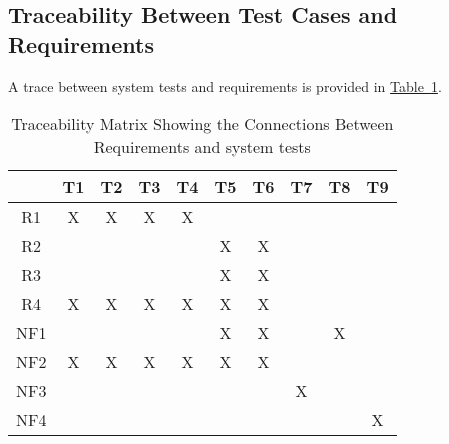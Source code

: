 \documentclass[12pt, titlepage]{article}
\begin{document}
\subsection{Traceability Between Test Cases and Requirements}
A trace between system tests and requirements is provided in 
\hyperref[tab:reqtrace]{Table~\ref*{tab:reqtrace}}.

\begin{table}[h!]
\centering
\begin{tabular}{|c|c|c|c|c|c|c|c|c|c|}
\hline
	& T1 & T2 & T3 & T4 & T5 & T6 & T7 &T8  & T9 \\
\hline
R1  & X&X&X& X& & & & & \\ \hline
R2  & & & & & X& X& &  & \\ \hline
R3  & & & & &X & X& &   &\\ \hline
R4  &X & X& X& X&X & X& & & \\ \hline
NF1 & & & & & X& X& & X &  \\ \hline
NF2   & X& X& X&X & X& X& & & \\ \hline
NF3   & & & & & & &X & & \\ \hline
NF4   & & & & & & & & &X \\ \hline
\hline
\end{tabular}
\caption{Traceability Matrix Showing the Connections Between Requirements and system tests}
\label{tab:reqtrace}
\end{table}
\end{document}
